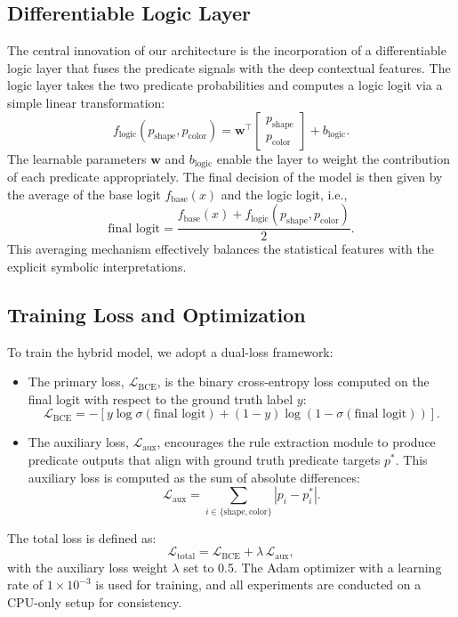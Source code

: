 \documentclass{article}
\begin{document}
\subsection{Differentiable Logic Layer}
The central innovation of our architecture is the incorporation of a differentiable logic layer that fuses the predicate signals with the deep contextual features. The logic layer takes the two predicate probabilities and computes a logic logit via a simple linear transformation:
\[
f_{\text{logic}}(p_{\text{shape}}, p_{\text{color}}) = \mathbf{w}^\top \begin{bmatrix} p_{\text{shape}} \\ p_{\text{color}} \end{bmatrix} + b_{\text{logic}}.
\]
The learnable parameters \( \mathbf{w} \) and \( b_{\text{logic}} \) enable the layer to weight the contribution of each predicate appropriately. The final decision of the model is then given by the average of the base logit \( f_{\text{base}}(x) \) and the logic logit, i.e.,
\[
\text{final logit} = \frac{f_{\text{base}}(x) + f_{\text{logic}}(p_{\text{shape}}, p_{\text{color}})}{2}.
\]
This averaging mechanism effectively balances the statistical features with the explicit symbolic interpretations.

\subsection{Training Loss and Optimization}
To train the hybrid model, we adopt a dual-loss framework:
\begin{itemize}
    \item The primary loss, \(\mathcal{L}_{\text{BCE}}\), is the binary cross-entropy loss computed on the final logit with respect to the ground truth label \( y \):
    \[
    \mathcal{L}_{\text{BCE}} = - \left[ y \log \sigma(\text{final logit}) + (1-y) \log (1-\sigma(\text{final logit})) \right].
    \]
    \item The auxiliary loss, \(\mathcal{L}_{\text{aux}}\), encourages the rule extraction module to produce predicate outputs that align with ground truth predicate targets \( p^{*} \). This auxiliary loss is computed as the sum of absolute differences:
    \[
    \mathcal{L}_{\text{aux}} = \sum_{i \in \{\text{shape}, \text{color}\}} \left| p_{i} - p^{*}_{i} \right|.
    \]
\end{itemize}
The total loss is defined as:
\[
\mathcal{L}_{\text{total}} = \mathcal{L}_{\text{BCE}} + \lambda \, \mathcal{L}_{\text{aux}},
\]
with the auxiliary loss weight \(\lambda\) set to 0.5. The Adam optimizer with a learning rate of \( 1 \times 10^{-3} \) is used for training, and all experiments are conducted on a CPU-only setup for consistency.
\end{document}
